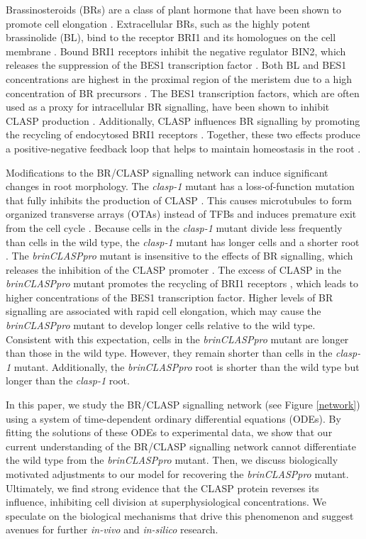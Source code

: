 \documentclass[referee,pdflatex,sn-mathphys-num]{sn-jnl}
\begin{document}
Brassinosteroids (BRs) are a class of plant hormone that have been shown to promote cell elongation \cite{ackerman-lavert2020}.
Extracellular BRs, such as the highly potent brassinolide (BL), bind to the receptor BRI1 and its homologues on the cell membrane \cite{vukasinovic2021}.
Bound BRI1 receptors inhibit the negative regulator BIN2, which releases the suppression of the BES1 transcription factor \cite{ackerman-lavert2020}.
Both BL and BES1 concentrations are highest in the proximal region of the meristem due to a high concentration of BR precursors \cite{vukasinovic2021}.
The BES1 transcription factors, which are often used as a proxy for intracellular BR signalling, have been shown to inhibit CLASP production \cite{ruan2018}.
Additionally, CLASP influences BR signalling by promoting the recycling of endocytosed BRI1 receptors \cite{ruan2018}.
Together, these two effects produce a positive-negative feedback loop that helps to maintain homeostasis in the root \cite{ruan2018}.

Modifications to the BR/CLASP signalling network can induce significant changes in root morphology.
The \emph{clasp-1} mutant has a loss-of-function mutation that fully inhibits the production of CLASP \cite{ambrose2007}.
This causes microtubules to form organized transverse arrays (OTAs) instead of TFBs and induces premature exit from the cell cycle \cite{halat2022}.
Because cells in the \emph{clasp-1} mutant divide less frequently than cells in the wild type, the \emph{clasp-1} mutant has longer cells and a shorter root \cite{ambrose2007}.
The \emph{brinCLASPpro} mutant is insensitive to the effects of BR signalling, which releases the inhibition of the CLASP promoter \cite{ruan2018}.
The excess of CLASP in the \emph{brinCLASPpro} mutant promotes the recycling of BRI1 receptors \cite{ruan2018}, which leads to higher concentrations of the BES1 transcription factor.
Higher levels of BR signalling are associated with rapid cell elongation, which may cause the \emph{brinCLASPpro} mutant to develop longer cells relative to the wild type.
Consistent with this expectation, cells in the \emph{brinCLASPpro} mutant are longer than those in the wild type.
However, they remain shorter than cells in the \emph{clasp-1} mutant.
Additionally, the \emph{brinCLASPpro} root is shorter than the wild type but longer than the \emph{clasp-1} root.

In this paper, we study the BR/CLASP signalling network (see Figure \ref{network}) using a system of time-dependent ordinary differential equations (ODEs).
By fitting the solutions of these ODEs to experimental data, we show that our current understanding of the BR/CLASP signalling network cannot differentiate the wild type from the \emph{brinCLASPpro} mutant.
Then, we discuss biologically motivated adjustments to our model for recovering the \emph{brinCLASPpro} mutant.
Ultimately, we find strong evidence that the CLASP protein reverses its influence, inhibiting cell division at superphysiological concentrations.
We speculate on the biological mechanisms that drive this phenomenon and suggest avenues for further \emph{in-vivo} and \emph{in-silico} research.
\end{document}
